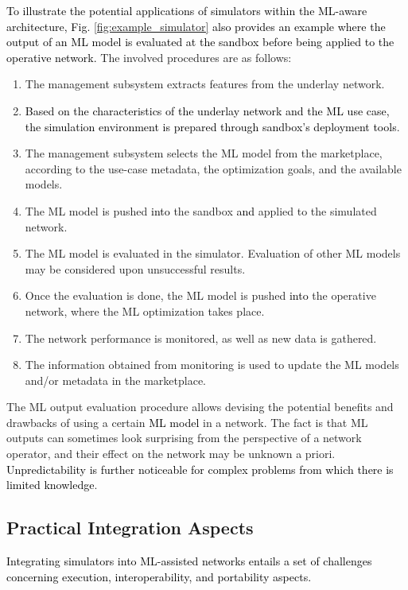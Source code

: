 \documentclass[journal]{IEEEtran}
\begin{document}
	\textcolor{black}{To illustrate the potential applications of simulators within the ML-aware architecture, Fig. \ref{fig:example_simulator} also provides an example where the output of an ML model is evaluated at the sandbox before being applied to the operative network.} The involved procedures are as follows:
	\begin{enumerate}
		\item The management subsystem extracts features from the underlay network.
		\item \textcolor{black}{Based on the characteristics of the underlay network and the ML use case, the simulation environment is prepared through sandbox's deployment tools}.
		\item The management subsystem selects the ML model from the marketplace, according to the use-case metadata, the optimization goals, and the available models.
		\item The ML model is pushed \textcolor{black}{into} the sandbox \textcolor{black}{and} applied to the simulated network.
		\item The ML model is evaluated in the simulator. Evaluation of other ML models may be considered upon unsuccessful results.
		\item Once the evaluation is done, the ML model is pushed \textcolor{black}{into} the operative network, where the ML optimization takes place. 
		\item The network performance is monitored, as well as new data is gathered.
		\item The information obtained from monitoring is used to update the ML models and/or metadata in the marketplace.  
	\end{enumerate}

    The ML output evaluation procedure allows devising the potential benefits and drawbacks of using a certain \textcolor{black}{ML model} in a network. The fact is that ML outputs can sometimes look surprising from the perspective of a network operator, and their effect on the network may be unknown a priori. \textcolor{black}{Unpredictability is further noticeable for complex problems from which there is limited knowledge}.

	\subsection{Practical Integration Aspects}
		     
	\textcolor{black}{Integrating simulators into ML-assisted networks entails a set of challenges concerning execution, interoperability, and portability aspects.}
	
\end{document}
